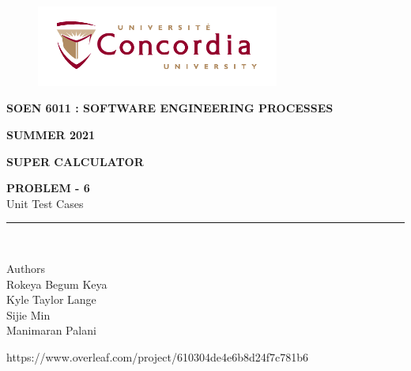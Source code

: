 \documentclass[letterpaper, 11pt]{report}
\begin{document}
\begin{titlepage}
\vspace*{0.7in}
\begin{center}
\begin{figure}[htb]
\begin{center}
\includegraphics[width=8cm]{univ_logo}
\end{center}
\end{figure}
\vspace*{0.3in}
\begin{Large}
\textbf{SOEN 6011 : SOFTWARE ENGINEERING PROCESSES} \\
\end{Large}
\vspace*{0.1in}
\begin{Large}
\textbf{SUMMER 2021} \\
\end{Large}
\vspace*{0.9in}
\begin{Large}
\textbf{SUPER CALCULATOR} \\
\end{Large}
\vspace*{0.9in}
\begin{Large} 


\textbf{PROBLEM - 6} \\
Unit Test Cases\\
\end{Large}
\vspace*{0.625in}
\rule{80mm}{0.1mm}\\
\vspace*{0.1in}
\begin{large}
Authors \\
\vspace*{0.1in}
Rokeya Begum Keya\\
\vspace*{0.1in}
Kyle Taylor Lange\\
\vspace*{0.1in}
Sijie Min\\
\vspace*{0.1in}
Manimaran Palani\\ 
\vspace*{0.3in}
\date{\normalsize\today} 
\end{large}
\end{center}
\begin{center}
https://www.overleaf.com/project/610304de4e6b8d24f7c781b6\end{center}
\end{titlepage}
\tableofcontents
\newpage
{}
\newpage
\pagebreak
\end{document}
